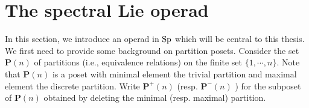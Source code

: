 %
%
%
%
\section{The spectral Lie operad}
\label{The spectral Lie operad}
In this section, we introduce an operad in $\operatorname{Sp}$ which will be central to this thesis. 
We first need to provide some background on partition posets. 
Consider the set $\mathbf{P}(n)$ of partitions (i.e., equivalence relations) on the finite set $\{1, \cdots, n \}$. Note that $\mathbf{P}(n)$ is a poset with minimal element the trivial partition and maximal element the discrete partition.
Write $\mathbf{P}^{+}(n)$ (resp. $\mathbf{P}^{-}(n)$ ) for the subposet of $\mathbf{P}(n)$ obtained by deleting the minimal (resp. maximal) partition.


